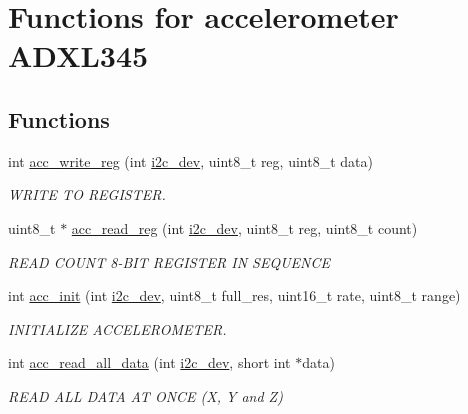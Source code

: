 \hypertarget{group__acc}{\section{Functions for accelerometer A\-D\-X\-L345}
\label{group__acc}
}
\subsection*{Functions}
\begin{DoxyCompactItemize}
\item 
int \hyperlink{group__acc_ga534116416343122de29a5b6ade6876bd}{acc\-\_\-write\-\_\-reg} (int \hyperlink{CommunicationV0_2communication_8c_a7751bd45ac1064efb35adf1f19c25db8}{i2c\-\_\-dev}, uint8\-\_\-t reg, uint8\-\_\-t data)
\begin{DoxyCompactList}\small\item\em W\-R\-I\-T\-E T\-O R\-E\-G\-I\-S\-T\-E\-R. \end{DoxyCompactList}\item 
uint8\-\_\-t $\ast$ \hyperlink{group__acc_ga2a91c44eebbe44f4d3b8c508633512f9}{acc\-\_\-read\-\_\-reg} (int \hyperlink{CommunicationV0_2communication_8c_a7751bd45ac1064efb35adf1f19c25db8}{i2c\-\_\-dev}, uint8\-\_\-t reg, uint8\-\_\-t count)
\begin{DoxyCompactList}\small\item\em R\-E\-A\-D C\-O\-U\-N\-T 8-\/\-B\-I\-T R\-E\-G\-I\-S\-T\-E\-R I\-N S\-E\-Q\-U\-E\-N\-C\-E \end{DoxyCompactList}\item 
int \hyperlink{group__acc_gae8f9cc6e0d15e61039d846305f86f073}{acc\-\_\-init} (int \hyperlink{CommunicationV0_2communication_8c_a7751bd45ac1064efb35adf1f19c25db8}{i2c\-\_\-dev}, uint8\-\_\-t full\-\_\-res, uint16\-\_\-t rate, uint8\-\_\-t range)
\begin{DoxyCompactList}\small\item\em I\-N\-I\-T\-I\-A\-L\-I\-Z\-E A\-C\-C\-E\-L\-E\-R\-O\-M\-E\-T\-E\-R. \end{DoxyCompactList}\item 
int \hyperlink{group__acc_ga013bb5ed8a763883fc440549d2b1a6ce}{acc\-\_\-read\-\_\-all\-\_\-data} (int \hyperlink{CommunicationV0_2communication_8c_a7751bd45ac1064efb35adf1f19c25db8}{i2c\-\_\-dev}, short int $\ast$data)
\begin{DoxyCompactList}\small\item\em R\-E\-A\-D A\-L\-L D\-A\-T\-A A\-T O\-N\-C\-E (X, Y and Z) \end{DoxyCompactList}\item 

\end{DoxyCompactItemize}

